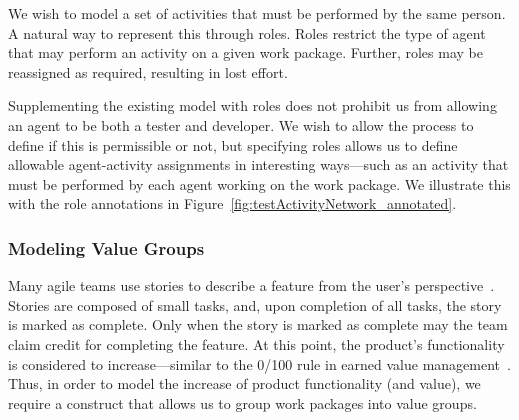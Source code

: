We wish to model a set of activities that must be performed by the same person. 
 A natural way to represent this through roles.  Roles restrict the type of
agent that may perform an activity on a given work package.  Further, roles may
be reassigned as required, resulting in lost effort.

Supplementing the existing model with roles does not prohibit us from allowing
an agent to be both a tester and developer.  We wish to allow the process to
define if this is permissible or not, but specifying roles allows us to define
allowable agent-activity assignments in interesting ways---such as an activity
that must be performed by each agent working on the work package.
We illustrate this with the role annotations in
Figure~\ref{fig:testActivityNetwork_annotated}.




% 

\subsubsection{Modeling Value Groups}
Many agile teams use stories to describe a feature from the user's
perspective~\cite{_state_2015}.  Stories are composed of small tasks, and,
upon completion of all tasks, the story is marked as complete.
Only when the story is marked as complete may the team claim credit for
completing the feature.  At this point, the product's functionality is
considered to increase---similar to the 0/100 rule in earned value
management~\cite{larson_project_2010}.
Thus, in order to model the increase of product functionality (and value), we
require a construct that allows us to group work packages into value groups.


